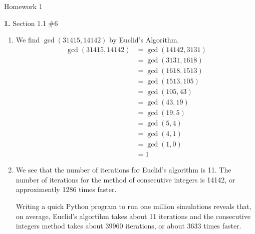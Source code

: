 \documentclass[letterpaper, 11pt]{article}
\newcommand{\hwnumber}[3]{\noindent\textbf{#1.} Section #2 \##3}
\begin{document}
\begin{center}
	{\LARGE Homework 1}\\
\end{center}

\hwnumber{1}{1.1}{6}

\begin{enumerate}[label = (\alph*)]
  \item We find $\gcd(31415, 14142)$ by Euclid's Algorithm.
    \begin{align*}
      \gcd(31415, 14142) &= \gcd(14142, 3131)\\
                         &= \gcd(3131, 1618)\\
                         &= \gcd(1618, 1513)\\
                         &= \gcd(1513, 105)\\
                         &= \gcd(105, 43)\\
                         &= \gcd(43, 19)\\
                         &= \gcd(19, 5)\\
                         &= \gcd(5, 4)\\
                         &= \gcd(4, 1)\\
                         &= \gcd(1, 0)\\
                         &= 1
    \end{align*}

  \item We see that the number of iterations for Euclid's algorithm is 11. The
    number of iterations for the method of consecutive integers is 14142, or
    approximently 1286 times faster. 

    Writing a quick Python program to run one million simulations reveals that,
    on average, Euclid's algortihm takes about 11 iterations and the consecutive
    integers method takes about 39960 iterations, or about 3633 times faster.
\end{enumerate}
\end{document}
